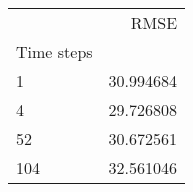 \begin{tabular}{lr}
\toprule
 & RMSE \\
Time steps &  \\
\midrule
1 & 30.994684 \\
4 & 29.726808 \\
52 & 30.672561 \\
104 & 32.561046 \\
\bottomrule
\end{tabular}
